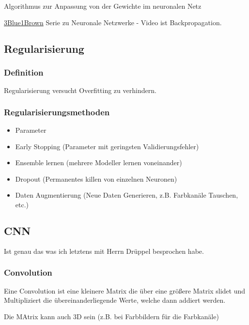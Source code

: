 \documentclass[a4paper]{article}
\begin{document}
Algorithmus zur Anpassung von der Gewichte im neuronalen Netz

\href{https://www.youtube.com/watch?v=Ilg3gGewQ5U&list=PLZHQObOWTQDNU6R1_67000Dx_ZCJB-3pi&index=3}{3Blue1Brown} Serie zu Neuronale Netzwerke - Video ist Backpropagation.

\subsection{Regularisierung}

\subsubsection{Definition}

Regularisierung versucht Overfitting zu verhindern.

\subsubsection{Regularisierungsmethoden}

\begin{itemize}
    \item Parameter
    \item Early Stopping (Parameter mit geringsten Validierungsfehler)
    \item Ensemble lernen (mehrere Modeller lernen voneinander)
    \item Dropout (Permanentes killen von einzelnen Neuronen)
    \item Daten Augmentierung (Neue Daten Generieren, z.B. Farbkanäle Tauschen, etc.)
\end{itemize}

\subsection{CNN}

Ist genau das was ich letztens mit Herrn Drüppel besprochen habe.

\subsubsection{Convolution}

Eine Convolution ist eine kleinere Matrix die über eine größere Matrix slidet und Multipliziert die übereinanderliegende Werte, welche dann addiert werden.

Die MAtrix kann auch 3D sein (z.B. bei Farbbildern für die Farbkanäle)
\end{document}
